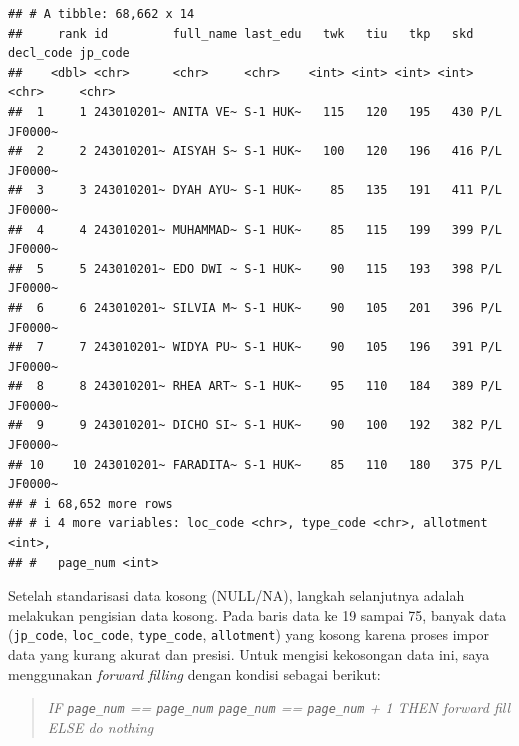 \documentclass[
]{article}
\begin{document}
\begin{verbatim}
## # A tibble: 68,662 x 14
##     rank id         full_name last_edu   twk   tiu   tkp   skd decl_code jp_code
##    <dbl> <chr>      <chr>     <chr>    <int> <int> <int> <int> <chr>     <chr>  
##  1     1 243010201~ ANITA VE~ S-1 HUK~   115   120   195   430 P/L       JF0000~
##  2     2 243010201~ AISYAH S~ S-1 HUK~   100   120   196   416 P/L       JF0000~
##  3     3 243010201~ DYAH AYU~ S-1 HUK~    85   135   191   411 P/L       JF0000~
##  4     4 243010201~ MUHAMMAD~ S-1 HUK~    85   115   199   399 P/L       JF0000~
##  5     5 243010201~ EDO DWI ~ S-1 HUK~    90   115   193   398 P/L       JF0000~
##  6     6 243010201~ SILVIA M~ S-1 HUK~    90   105   201   396 P/L       JF0000~
##  7     7 243010201~ WIDYA PU~ S-1 HUK~    90   105   196   391 P/L       JF0000~
##  8     8 243010201~ RHEA ART~ S-1 HUK~    95   110   184   389 P/L       JF0000~
##  9     9 243010201~ DICHO SI~ S-1 HUK~    90   100   192   382 P/L       JF0000~
## 10    10 243010201~ FARADITA~ S-1 HUK~    85   110   180   375 P/L       JF0000~
## # i 68,652 more rows
## # i 4 more variables: loc_code <chr>, type_code <chr>, allotment <int>,
## #   page_num <int>
\end{verbatim}

Setelah standarisasi data kosong (NULL/NA), langkah selanjutnya adalah
melakukan pengisian data kosong. Pada baris data ke 19 sampai 75, banyak
data (\texttt{jp\_code}, \texttt{loc\_code}, \texttt{type\_code},
\texttt{allotment}) yang kosong karena proses impor data yang kurang
akurat dan presisi. Untuk mengisi kekosongan data ini, saya menggunakan
\emph{forward filling} dengan kondisi sebagai berikut:

\begin{quote}
\emph{IF \texttt{page\_num} == \texttt{page\_num} \textbar{}
\texttt{page\_num} == \texttt{page\_num} + 1 THEN forward fill ELSE do
nothing}
\end{quote}
\end{document}

